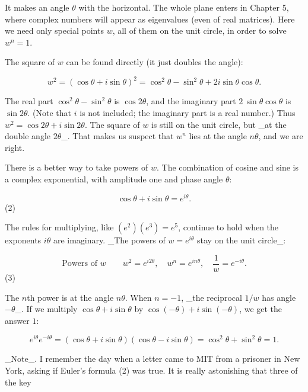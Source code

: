 It makes an angle \(\theta\) with the horizontal. The whole plane enters in Chapter 5, where complex numbers will appear as eigenvalues (even of real matrices). Here we need only special points \(w\), all of them on the unit circle, in order to solve \(w^{n}=1\).

The square of \(w\) can be found directly (it just doubles the angle):

\[w^{2}=(\cos\theta+i\sin\theta)^{2}=\cos^{2}\theta-\sin^{2}\theta+2i\sin\theta \cos\theta.\]

The real part \(\cos^{2}\theta-\sin^{2}\theta\) is \(\cos 2\theta\), and the imaginary part \(2\,\sin\theta\cos\theta\) is \(\sin 2\theta\). (Note that \(i\) is not included; the imaginary part is a real number.) Thus \(w^{2}=\cos 2\theta+i\sin 2\theta\). The square of \(w\) is still on the unit circle, but _at the double angle \(2\theta\)_. That makes us suspect that \(w^{n}\) lies at the angle \(n\theta\), and we are right.

There is a better way to take powers of \(w\). The combination of cosine and sine is a complex exponential, with amplitude one and phase angle \(\theta\):

\[\cos\theta+i\sin\theta=e^{i\theta}.\] (2)

The rules for multiplying, like \((e^{2})(e^{3})=e^{5}\), continue to hold when the exponents \(i\theta\) are imaginary. _The powers of \(w=e^{i\theta}\) stay on the unit circle_:

\[\text{{Powers of }}w\qquad w^{2}=e^{i2\theta},\quad w^{n}=e^{in\theta},\quad \frac{1}{w}=e^{-i\theta}.\] (3)

The \(n\)th power is at the angle \(n\theta\). When \(n=-1\), _the reciprocal \(1/w\) has angle \(-\theta\)_. If we multiply \(\cos\theta+i\sin\theta\) by \(\cos(-\theta)+i\sin(-\theta)\), we get the answer \(1\):

\[e^{i\theta}e^{-i\theta}=(\cos\theta+i\sin\theta)(\cos\theta-i\sin\theta)=\cos^ {2}\theta+\sin^{2}\theta=1.\]

_Note_. I remember the day when a letter came to MIT from a prisoner in New York, asking if Euler's formula (2) was true. It is really astonishing that three of the key 